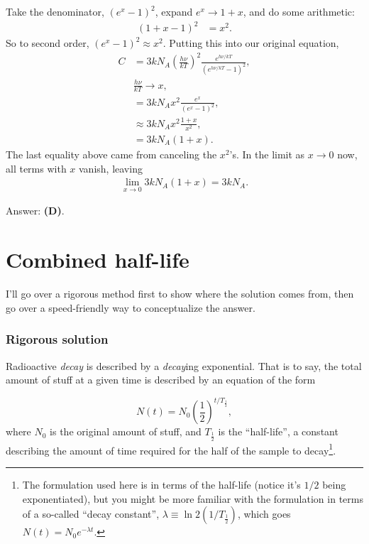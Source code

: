 \documentclass[11pt]{paper}
\newcommand{\answer}[1]{Answer: \textbf{(#1)}.}
\begin{document}
Take the denominator, $(e^x-1)^2$,  expand $e^x\rightarrow1+x$, and do some arithmetic:
\begin{align}
(1+x - 1)^2 &= x^2.
\end{align}
So to second order, $(e^x-1)^2 \approx x^2$.  Putting this into our original equation,
\begin{align}
C &= 3kN_A\left(\frac{h\nu}{kT}\right)^2\frac{e^{h\nu/kT}}{\left(e^{h\nu/kT}-1\right)^2},\\
&\frac{h\nu}{kT} \rightarrow x,\\
&= 3kN_Ax^2\frac{e^{x}}{\left(e^{x}-1\right)^2},\\
&\approx 3kN_Ax^2\frac{1+x}{x^2},\\
&= 3kN_A\left(1+x\right).
\end{align}
The last equality above came from canceling the $x^2$'s.  In the limit as $x\rightarrow0$ now, all terms with $x$ vanish, leaving
\begin{align}
\lim_{x\rightarrow0} 3kN_A\left(1+x\right) = 3kN_A.
\end{align}

\answer{D}

\section{Combined half-life}
I'll go over a rigorous method first to show where the solution comes from, then go over a speed-friendly way to conceptualize the answer.

\subsubsection*{Rigorous solution}
Radioactive \emph{decay} is described by a \emph{decay}ing exponential.  That is to say, the total amount of stuff at a given time is described by an equation of the form

\begin{equation}
N(t) = N_0 \left(\frac{1}{2}\right)^{t/T_{\frac{1}{2}}},
\end{equation}
where $N_0$ is the original amount of stuff, and $T_{\frac{1}{2}}$ is the ``half-life'', a constant describing the amount of time required for the half of the sample to decay\footnote{The formulation used here is in terms of the half-life (notice it's $1/2$ being exponentiated), but you might be more familiar with the formulation in terms of a so-called ``decay constant'', $\lambda \equiv \ln{2}\left(1/T_{\frac{1}{2}}\right)$, which goes $N(t) = N_0 e^{-\lambda t}$.}.
\end{document}
